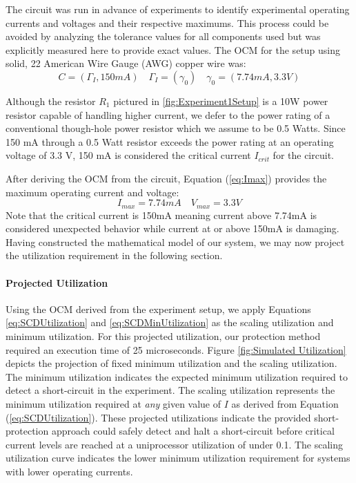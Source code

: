 The circuit was run in advance of experiments to identify experimental operating currents and voltages and their respective maximums. This process could be avoided by analyzing the tolerance values for all components used but was explicitly measured here to provide exact values. The OCM for the setup using solid, 22 American Wire Gauge (AWG) copper wire was:
\begin{equation}\label{eq:OCMSetup}
C = (\Gamma_{I}, 150mA) \quad \Gamma_{I} = (\gamma_{0}) \quad \gamma_{0} = (7.74mA, 3.3V) \nonumber
\end{equation}

Although the resistor $R_{1}$ pictured in \ref{fig:Experiment1Setup} is a 10W power resistor capable of handling higher current, we defer to the power rating of a conventional though-hole power resistor which we assume to be 0.5 Watts. Since 150 mA through a 0.5 Watt resistor exceeds the power rating at an operating voltage of 3.3 V, 150 mA is considered the critical current $I_{crit}$ for the circuit.

After deriving the OCM from the circuit, Equation (\ref{eq:Imax}) provides the maximum operating current and voltage:
\begin{equation}
I_{max} =  7.74mA \nonumber \quad V_{max} = 3.3V \nonumber
\end{equation}
Note that the critical current is 150mA meaning current above 7.74mA is considered unexpected behavior while current at or above 150mA is damaging. Having constructed the mathematical model of our system, we may now project the utilization requirement in the following section. 

\paragraph{Projected Utilization}
Using the OCM derived from the experiment setup, we apply Equations \ref{eq:SCDUtilization} and \ref{eq:SCDMinUtilization} as the scaling utilization and minimum utilization. For this projected utilization, our protection method required an execution time of 25 microseconds. Figure \ref{fig:Simulated Utilization} depicts the projection of fixed minimum utilization and the scaling utilization. The minimum utilization indicates the expected minimum utilization required to detect a short-circuit in the experiment. The scaling utilization represents the minimum utilization required at \textit{any} given value of $I$ as derived from Equation (\ref{eq:SCDUtilization}). These projected utilizations indicate the provided short-protection approach could safely detect and halt a short-circuit before critical current levels are reached at a uniprocessor utilization of under 0.1. The scaling utilization curve indicates the lower minimum utilization requirement for systems with lower operating currents.

